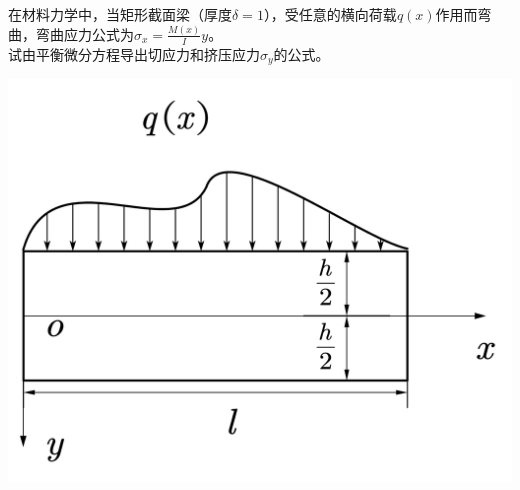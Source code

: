 \begin{example}
	在材料力学中，当矩形截面梁（厚度$\delta =1$），受任意的横向荷载$q\left( x \right) $作用而弯曲，弯曲应力公式为$\sigma _x=\frac{M\left( x \right)}{I}y$。\\
	试由平衡微分方程导出切应力和挤压应力$\sigma _y$的公式。
\end{example}
\centerline{\includegraphics[scale=0.5]{figure/2-14.png}}
